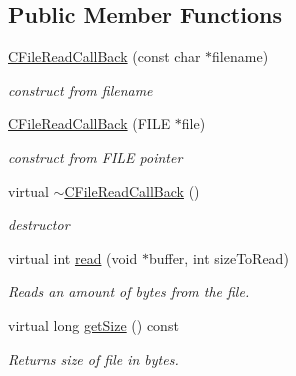 \subsection*{Public Member Functions}
\begin{DoxyCompactItemize}
\item 
\hypertarget{classirr_1_1io_1_1_c_file_read_call_back_aabc79875f8e09ff21d9c2a01f1907eca}{\hyperlink{classirr_1_1io_1_1_c_file_read_call_back_aabc79875f8e09ff21d9c2a01f1907eca}{C\-File\-Read\-Call\-Back} (const char $\ast$filename)}\label{classirr_1_1io_1_1_c_file_read_call_back_aabc79875f8e09ff21d9c2a01f1907eca}

\begin{DoxyCompactList}\small\item\em construct from filename \end{DoxyCompactList}\item 
\hypertarget{classirr_1_1io_1_1_c_file_read_call_back_a19c2fe29ebd44f95b33ef85e26cd7ca9}{\hyperlink{classirr_1_1io_1_1_c_file_read_call_back_a19c2fe29ebd44f95b33ef85e26cd7ca9}{C\-File\-Read\-Call\-Back} (F\-I\-L\-E $\ast$file)}\label{classirr_1_1io_1_1_c_file_read_call_back_a19c2fe29ebd44f95b33ef85e26cd7ca9}

\begin{DoxyCompactList}\small\item\em construct from F\-I\-L\-E pointer \end{DoxyCompactList}\item 
\hypertarget{classirr_1_1io_1_1_c_file_read_call_back_aff501b54688e10c2cd0418f982f52799}{virtual \hyperlink{classirr_1_1io_1_1_c_file_read_call_back_aff501b54688e10c2cd0418f982f52799}{$\sim$\-C\-File\-Read\-Call\-Back} ()}\label{classirr_1_1io_1_1_c_file_read_call_back_aff501b54688e10c2cd0418f982f52799}

\begin{DoxyCompactList}\small\item\em destructor \end{DoxyCompactList}\item 
\hypertarget{classirr_1_1io_1_1_c_file_read_call_back_ab2d4c4e10cd2b03af1173fbc25f87741}{virtual int \hyperlink{classirr_1_1io_1_1_c_file_read_call_back_ab2d4c4e10cd2b03af1173fbc25f87741}{read} (void $\ast$buffer, int size\-To\-Read)}\label{classirr_1_1io_1_1_c_file_read_call_back_ab2d4c4e10cd2b03af1173fbc25f87741}

\begin{DoxyCompactList}\small\item\em Reads an amount of bytes from the file. \end{DoxyCompactList}\item 
\hypertarget{classirr_1_1io_1_1_c_file_read_call_back_abbbe77c49144add20baccf38470453cb}{virtual long \hyperlink{classirr_1_1io_1_1_c_file_read_call_back_abbbe77c49144add20baccf38470453cb}{get\-Size} () const }\label{classirr_1_1io_1_1_c_file_read_call_back_abbbe77c49144add20baccf38470453cb}

\begin{DoxyCompactList}\small\item\em Returns size of file in bytes. \end{DoxyCompactList}\end{DoxyCompactItemize}


